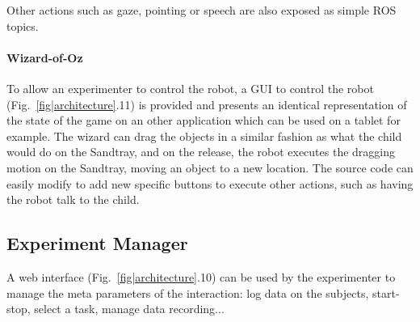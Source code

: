 \documentclass[sigconf]{acmart}
\begin{document}
Other actions such as gaze, pointing or speech are also exposed as simple ROS
topics.

\paragraph{Wizard-of-Oz} To allow an experimenter to control the robot, a GUI to
control the robot (Fig.~\ref{fig|architecture}.11) is provided and presents an
identical representation of the state of the game on an other application which
can be used on a tablet for example. The wizard can drag the objects in a
similar fashion as what the child would do on the Sandtray, and on the release,
the robot executes the dragging motion on the Sandtray, moving an object to a
new location. The source code can easily modify to add new specific buttons to
execute other actions, such as having the robot talk to the child.


\subsection{Experiment Manager}

A web interface (Fig.~\ref{fig|architecture}.10) can be used by the experimenter
to manage the meta parameters of the interaction: log data on the subjects,
start-stop, select a task, manage data recording...
\end{document}

